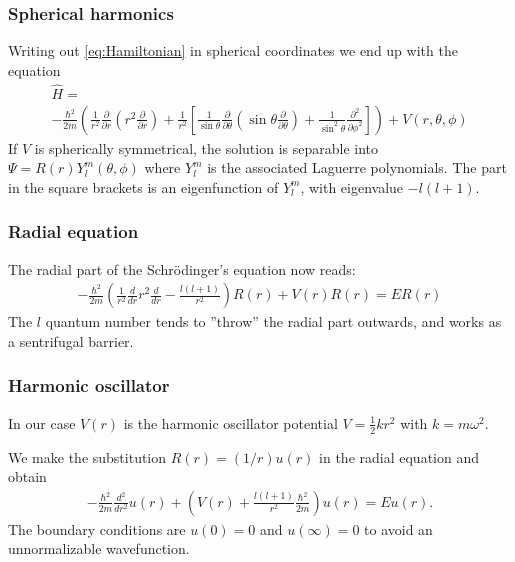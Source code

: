 \documentclass[11pt,a4paper,english,draft]{article}
\numberwithin{equation}{section}
\let\oldhat\hat
\renewcommand{\hat}[1]{\oldhat{#1}}
\begin{document}
\subsubsection{Spherical harmonics}
Writing out \eqref{eq:Hamiltonian} in spherical coordinates we end up
with the equation
\begin{gather}
\nonumber \hat{H} = \\
-\frac{\hbar^2}{2m}\left(\frac{1}{r^2}\frac{\partial}{\partial r}
\left( r^2\frac{\partial }{\partial r}\right)
+ \frac{1}{r^2}\left[ \frac{1}{\sin\theta}\frac{\partial}{\partial \theta}
\left( \sin\theta \frac{\partial}{\partial \theta}\right)
+ \frac{1}{\sin^2\theta}\frac{\partial^2}{\partial \phi^2}
\right]\right) + V(r,\theta,\phi)
\end{gather}
If $V$ is spherically symmetrical, the solution is separable into
$\Psi = R(r)Y_l^m(\theta, \phi)$ where $Y_l^m$ is the associated Laguerre
polynomials. The part in the square brackets is an eigenfunction of 
$Y_l^m$, with eigenvalue $-l(l+1)$. 


\subsubsection{Radial equation}

The radial part of the Schrödinger's equation now reads:
\begin{gather}
  -\frac{\hbar^2}{2 m} \left ( \frac{1}{r^2} \frac{d}{dr} r^2
  \frac{d}{dr} - \frac{l (l + 1)}{r^2} \right )R(r) 
     + V(r) R(r) = E R(r)
\label{eq:radial}
\end{gather}
The $l$ quantum number tends to ''throw'' the radial part outwards,
and works as a sentrifugal barrier.

\subsubsection{Harmonic oscillator}
In our case $V(r)$ is the harmonic oscillator potential 
$V = \frac{1}{2}k r^2$ with
$k=m\omega^2$. 

We make the substitution $R(r) = (1/r) u(r)$ in the radial
equation and obtain
\begin{gather}
  -\frac{\hbar^2}{2 m} \frac{d^2}{dr^2} u(r) 
       + \left ( V(r) + \frac{l (l + 1)}{r^2}\frac{\hbar^2}{2 m}
                                    \right ) u(r)  = E u(r) .
\end{gather}
The boundary conditions are $u(0)=0$ and $u(\infty)=0$ to avoid
an unnormalizable wavefunction.
\end{document}
